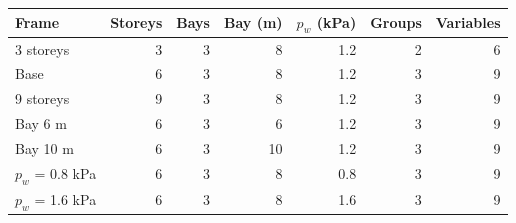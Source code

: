 \begin{tabular}{lrrrrrr}
\toprule
Frame & Storeys & Bays & Bay (m) & $p_w$ (kPa) & Groups & Variables \\
\midrule
3 storeys & 3 & 3 & 8 & 1.2 & 2 & 6 \\
Base & 6 & 3 & 8 & 1.2 & 3 & 9 \\
9 storeys & 9 & 3 & 8 & 1.2 & 3 & 9 \\
Bay 6 m & 6 & 3 & 6 & 1.2 & 3 & 9 \\
Bay 10 m & 6 & 3 & 10 & 1.2 & 3 & 9 \\
$p_w$ = 0.8 kPa & 6 & 3 & 8 & 0.8 & 3 & 9 \\
$p_w$ = 1.6 kPa & 6 & 3 & 8 & 1.6 & 3 & 9 \\
\bottomrule
\end{tabular}